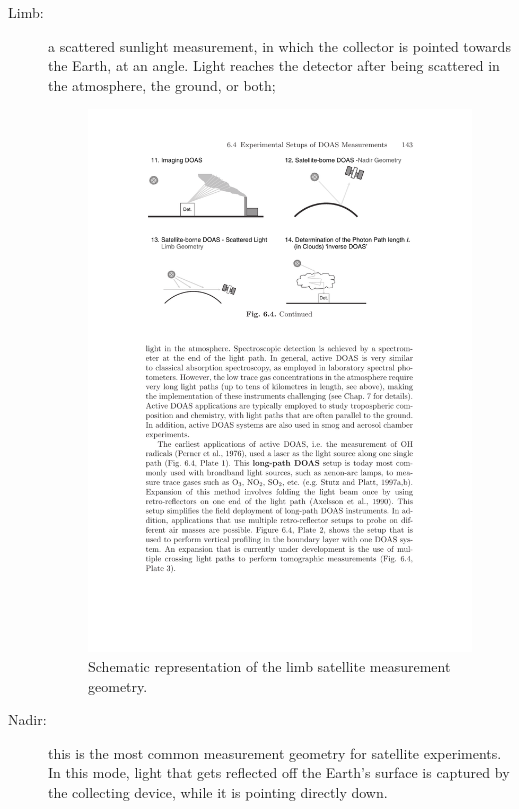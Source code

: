 \begin{description}
    \item[Limb:] a scattered sunlight measurement, in which the
        collector is pointed towards the Earth, at an angle. Light
        reaches the detector after being scattered in the atmosphere,
        the ground, or both;
        \begin{figure}[htpb]
            \centering
            \includegraphics[trim=3cm 19cm 12cm
            8.5cm, clip, width=\textwidth]{img/pdf/imaging.pdf}
            \caption{Schematic representation of the limb satellite
            measurement geometry.}
            \label{fig:limb}
        \end{figure}
    \item[Nadir:] this is the most common measurement geometry for
        satellite experiments. In this mode, light that gets reflected
        off the Earth's surface is captured by the collecting device,
        while it is pointing directly down.

\end{description}
